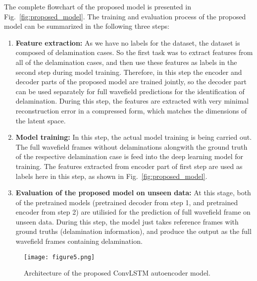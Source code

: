 The complete flowchart of the proposed model is presented in 
Fig.~\ref{fig:proposed_model}. 
The training and evaluation process of the proposed model can be summarized in 
the following three steps:  
\begin{enumerate}
	\item{\textbf{Feature extraction:} As we have no labels for the dataset, 
		the dataset is composed of delamination cases. 
		So the first task was to extract features from all of the delamination 
		cases, and then use these features as labels in the second step during 
		model training.
		Therefore, in this step the encoder and decoder parts of the proposed 
		model are trained jointly, so the decoder part can be used separately 
		for full wavefield predictions for the identification of delamination.
		During this step, the features are extracted with very minimal 
		reconstruction error in a compressed form, which matches the dimensions 
		of the latent space.}
	\item{\textbf{Model training:} In this step, the actual model training is 
		being carried out. 
		The full wavefield frames without delaminations alongwith the ground 
		truth 
		of the respective delamination case is feed into the deep learning 
		model 
		for training. 
		The features extracted from encoder part of first step are used as 
		labels 
		here in this step, as shown in Fig.~\ref{fig:proposed_model}}.
	\item{\textbf{Evaluation of the proposed model on unseen data:} At this 
		stage, both of the pretrained models (pretrained decoder from step 1, 
		and pretrained encoder from step 2) are utilisied for the prediction of 
		full wavefield frame on unseen data.
		During this step, the model just takes reference frames with ground 
		truths (delamination information), and produce the output as the full 
		wavefield frames containing delamination.}
\end{enumerate}

\begin{figure} [h!]
	\begin{center}
		\texttt{[image: figure5.png]}
	\end{center}
	\caption{Architecture of the proposed ConvLSTM autoencoder model.} 
	\label{fig:convlstm}
\end{figure}

